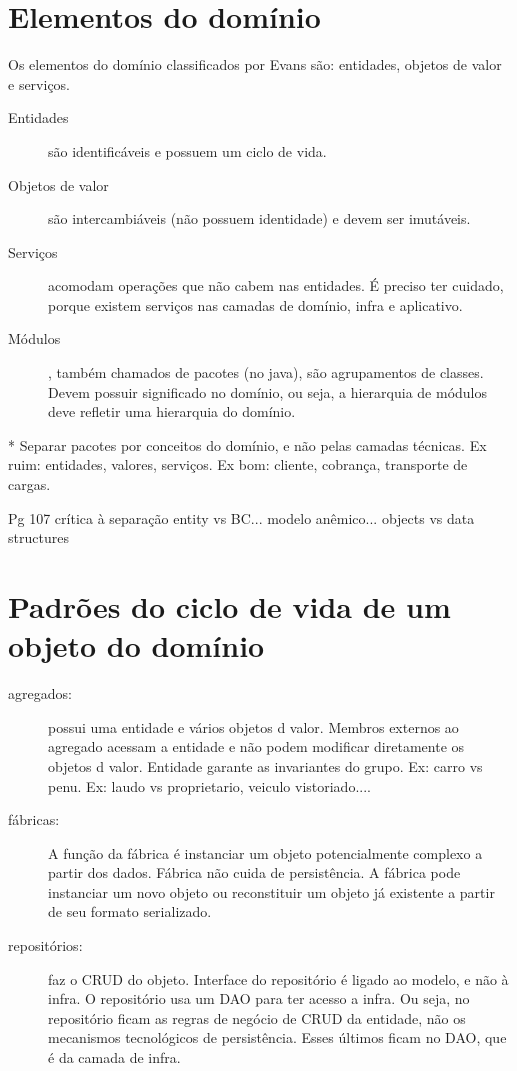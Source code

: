 \documentclass[a4paper, 12pt]{article}
\begin{document}
\section{Elementos do domínio}

Os elementos do domínio classificados por Evans são: entidades, objetos de valor e serviços.

\begin{description}
\item [Entidades] são identificáveis e possuem um ciclo de vida. 
\item [Objetos de valor] são intercambiáveis (não possuem identidade) e devem ser imutáveis.
\item [Serviços] acomodam operações que não cabem nas entidades. É preciso ter cuidado, porque existem serviços nas camadas de domínio, infra e aplicativo.
\item [Módulos], também chamados de pacotes (no java), são agrupamentos de classes. Devem possuir significado no domínio, ou seja, a hierarquia de módulos deve refletir uma hierarquia do domínio.
\end{description}

* Separar pacotes por conceitos do domínio, e não pelas camadas técnicas. Ex ruim: entidades, valores, serviços. Ex bom: cliente, cobrança, transporte de cargas.

Pg 107 crítica à separação entity vs BC... modelo anêmico... objects vs data structures

\section{Padrões do ciclo de vida de um objeto do domínio}

\begin{description}
\item [agregados:] possui uma entidade e vários objetos d valor. Membros externos ao agregado acessam a entidade e não podem modificar diretamente os objetos d valor. Entidade garante as invariantes do grupo. Ex: carro vs penu. Ex: laudo vs {proprietario, veiculo vistoriado...}.
\item [fábricas:] A função da fábrica é instanciar um objeto potencialmente complexo a partir dos dados. Fábrica não cuida de persistência. A fábrica pode instanciar um novo objeto ou reconstituir um objeto já existente a partir de seu formato serializado.
\item [repositórios:] faz o CRUD do objeto. Interface do repositório é ligado ao modelo, e não à infra. O repositório usa um DAO para ter acesso a infra. Ou seja, no repositório ficam as regras de negócio de CRUD da entidade, não os mecanismos tecnológicos de persistência. Esses últimos ficam no DAO, que é da camada de infra.
\end{description}
\end{document}
